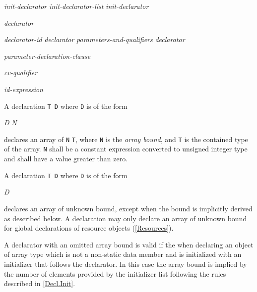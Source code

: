 \begin{grammar}
  \br
  \textit{init-declarator}\br
  \textit{init-declarator-list} \terminal{,} \textit{init-declarator}\br

  \br
  \textit{declarator} \br

  \br
  \textit{declarator-id} \br
  \textit{declarator} \textit{parameters-and-qualifiers}\br
  \textit{declarator} \terminal{[}  \terminal{]} \br

  \br
  \terminal{(} \textit{parameter-declaration-clause} \terminal{)}  \br

  \br
  \textit{cv-qualifier} \br

  \br
  \br

  \br
  \textit{id-expression}\br

\end{grammar}


\p A declaration \texttt{T D} where \texttt{D} is of the form

\begin{grammar}
\textit{D} \terminal{[} \textit{N} \terminal{]} \br
\end{grammar}

declares an array of \texttt{N} \texttt{T}, where \texttt{N} is the \textit{array
bound}, and \texttt{T} is the contained type of the array. \texttt{N} shall be a
constant expression converted to unsigned integer type and shall have a value
greater than zero.

\p A declaration \texttt{T D} where \texttt{D} is of the form

\begin{grammar}
\textit{D} \terminal{[} \terminal{]} \br
\end{grammar}

declares an array of unknown bound, except when the bound is implicitly derived
as described below. A declaration may only declare an array of unknown bound for
global declarations of resource objects (\ref{Resources}).

\p A declarator with an omitted array bound is valid if the when declaring an
object of array type which is not a non-static data member and is initialized
with an initializer that follows the declarator. In this case the array bound is
implied by the number of elements provided by the initializer list following the
rules described in \ref{Decl.Init}.

